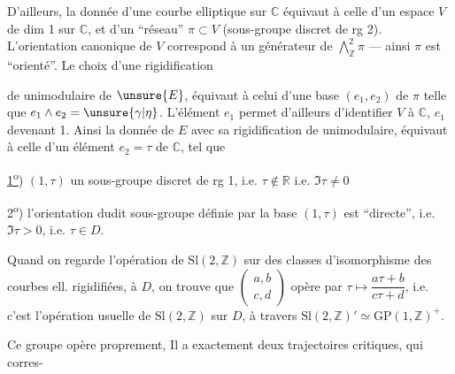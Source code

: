 
D'ailleurs, la donnée d'une courbe elliptique  sur $\mathbb C$ équivaut à celle d'un espace $V$ de dim 1 sur $\mathbb C$, et d'un ``réseau'' $\pi\subset V$ (sous-groupe discret de rg 2).
L'orientation canonique de $V$ correspond à un générateur \unsure{$\gamma|\eta$} de $\bigwedge^2_{\mathbb Z}\pi$ --- ainsi $\pi$ est ``orienté''. Le choix d'une rigidification


de  unimodulaire de $\unsure{E}$, équivaut à celui d'une base $(e_1,e_2)$ de $\pi$  telle que $e_1\wedge e_2=\unsure{\gamma|\eta}$. L'élément $e_1$  permet d'ailleurs d'identifier $V$ à $\mathbb C$, $e_1$ devenant 1. Ainsi la donnée de $E$ avec sa rigidification de  unimodulaire, équivaut à celle d'un élément $e_2=\tau$ de $\mathbb C$, tel que

\uline{1\textsuperscript{o}}) $(1,\tau)$  un sous-groupe discret de rg 1, i.e. $\tau\notin\mathbb R$ i.e. $\Im\tau\ne0$

2\textsuperscript{o}) l'orientation dudit sous-groupe définie par la base $(1,\tau)$ est ``directe'', i.e. $\Im\tau>0$, i.e. $\tau\in D$.

Quand on regarde l'opération de $\mathrm{Sl}(2,\mathbb Z)$ sur  des classes d'isomorphisme des courbes ell. rigidifiées,   à $D$, on trouve que $\begin{pmatrix}a,b\\c,d\end{pmatrix}$ opère par $\tau\longmapsto\dfrac{a\tau+b}{c\tau+d}$, i.e. c'est l'opération usuelle de $\mathrm{Sl}(2,\mathbb Z)$ sur $D$, à travers $\mathrm{Sl}(2,\mathbb Z)'\simeq\mathrm{GP}(1,\mathbb Z)^+$.

Ce groupe opère proprement, Il a exactement deux trajectoires critiques, qui corres-
